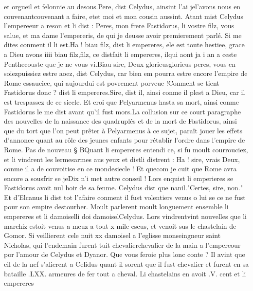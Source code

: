 \documentclass{article}
\begin{document}
\begin{pages}
      et orgueil et felonnie au desous.Pere, dist Celydus, ainsint 
      l’ai jel'avons nous en 
      couvenantcouvenant a faire, 
      etet moi et mon cousin 
      aussint. \pend
\pstart Atant mist Celydus l’empereeur 
   a reson et li dist :
   Peres, mon frere Fastidorus, 
      li vostre filz, vous salue, 
      et ma dame l’empereris, 
      de qui je deusse avoir premierement parlé. Si 
      me dites conment il li est.Ha ! biau filz, dist 
      li empereres, ele est toute hestiee, grace 
      a Dieu avons iiii biau 
      filz,filz, ce distfait 
         li empereres,
      ilqui 
         aont ja i an a ceste Penthecouste 
      que je ne vous vi.Biau sire, Deux glorieusglorieus peres, 
      vous en soiezpuissiez estre aoez, dist Celydus, car bien em pourra estre encore l’empire de 
      Rome essauciee, qui aujourdui est povrement porveue !Conment se tient Fastidorus 
      donc ? dist li empereres.Sire, dist il, ainsi conme il plest a Dieu, car il est trespassez de ce siecle. 
      Et croi que Pelyarmenus hasta sa mort, 
   ainsi conme Fastidorus le me dist avant 
      qu’il fust mors.La collusion sur ce court paragraphe des nouvelles de 
         la naissance des quadruplés et de la mort de Fastidorus, ainsi que du tort que l'on peut prêter à Pelyarmenus à ce sujet, 
      paraît jouer les effets d'annonce quant au rôle des jeunes enfants pour rétablir l'ordre dans l'empire de Rome. \pend
\pstart Pas de nouveau § BQuant 
   li empereres entendi ce, si fu moult courrouciez, et li vindrent les 
   lermesarmes aus yeux et 
   distli distrent :
   Ha ! sire, vrais Deux, 
      conme il a de couvoitise en ce mondesiecle ! 
      Et quecom je cuit que Rome avra encore 
      a sousfrir se jeDix n’i met autre conseil !
   Lors enquist li emperieres se 
      Fastidorus avoit nul hoir de sa fenme. 
   Celydus dist que nanil."Certes, sire, non." 
   Et d’Elcanus li dist 
   tot l’afaire conment il fust volentiers venus o lui se ce ne fust pour son empire destourber. \pend
\pstart Moult parlerent moult longuement ensemble 
   li empereres 
   et li damoiselli doi damoiselCelydus. 
   Lors vindrentvint nouvelles que 
   li marchiz 
   estoit venus a meuz a tout x mile escus, et venoit sus 
   le chastelain de Gomor. 
   Si veillierent cele nuit xx damoisel a l’eglisse monseingneur 
      saint Nicholas, 
   qui l’endemain furent tuit chevalierchevalier de la main a l'empereour por l'amour
   de Celydus et Dyanor. Que vous feroie plus lonc conte ? Il avint que cil de la nef s'alierent a Celidus quant il sorent que il fust
   chevalier et furent en sa bataille .LXX. armeures de fer tout a cheval. Li chastelains en avoit .V. cent et li empereres

\end{pages}
\end{document}

